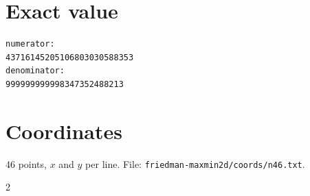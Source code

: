 \documentclass[11pt,a4paper]{article}
\begin{document}
\appendix
\section{Exact value}
{\small
\begin{verbatim}
numerator:
43716145205106803030588353
denominator:
999999999998347352488213
\end{verbatim}}

\section{Coordinates}
46 points, $x$ and $y$ per line. File: \texttt{friedman-maxmin2d/coords/n46.txt}.
{\tiny
\begin{multicols}{2}
\end{multicols}}
\end{document}
